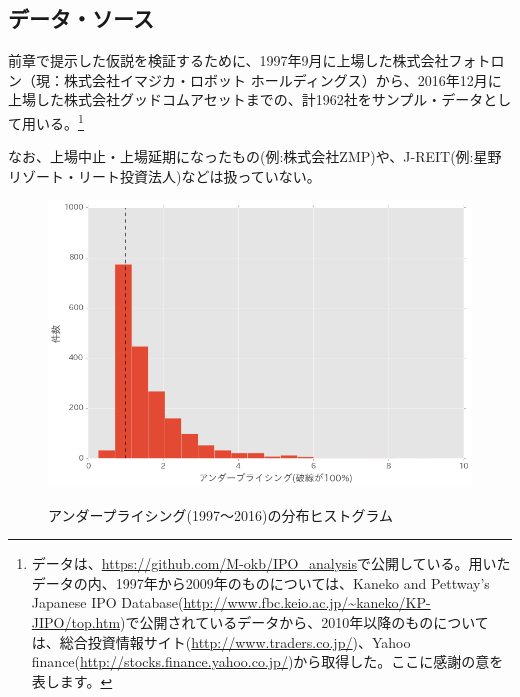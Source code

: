 \documentclass{jsarticle}
\begin{document}
\subsection{データ・ソース}
前章で提示した仮説を検証するために、1997年9月に上場した株式会社フォトロン（現：株式会社イマジカ・ロボット ホールディングス）から、2016年12月に上場した株式会社グッドコムアセットまでの、計1962社をサンプル・データとして用いる。\footnote[7]{データは、\url{https://github.com/M-okb/IPO_analysis}で公開している。用いたデータの内、1997年から2009年のものについては、Kaneko and Pettway’s Japanese IPO Database(\url{http://www.fbc.keio.ac.jp/~kaneko/KP-JIPO/top.htm})で公開されているデータから、2010年以降のものについては、総合投資情報サイト(\url{http://www.traders.co.jp/})、Yahoo finance(\url{http://stocks.finance.yahoo.co.jp/})から取得した。ここに感謝の意を表します。}\par
なお、上場中止・上場延期になったもの(例:株式会社ZMP)や、J-REIT(例:星野リゾート・リート投資法人)などは扱っていない。\par
\newpage

\begin{figure}[!h]
  \begin{center}
  \caption{アンダープライシング(1997〜2016)の分布ヒストグラム}
    \includegraphics[clip,width=14cm]{./hist.png}
    \label{hist}
  \end{center}
\end{figure}
\end{document}
